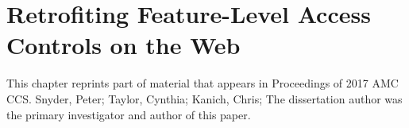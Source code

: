 \chapter{Retrofiting Feature-Level Access Controls on the Web}
\label{current-web}

This chapter reprints part of material that appears in
Proceedings of 2017 AMC CCS. Snyder, Peter; Taylor,
Cynthia; Kanich, Chris; The dissertation author was the primary investigator and
author of this paper.




